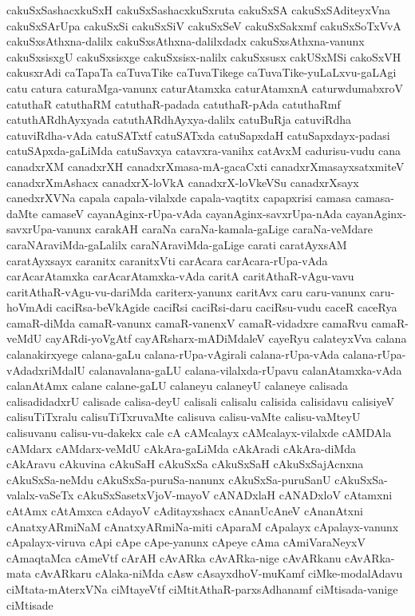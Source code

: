 {cakuSxSashacxkuSxH
cakuSxSashacxkuSxruta
cakuSxSA
cakuSxSAditeyxVna
cakuSxSArUpa
cakuSxSi
cakuSxSiV
cakuSxSeV
cakuSxSakxmf
cakuSxSoTxVvA
cakuSxsAthxna-dalilx
cakuSxsAthxna-dalilxdadx
cakuSxsAthxna-vanunx
cakuSxsisxgU
cakuSxsisxge
cakuSxsisx-nalilx
cakuSxsusx
cakUSxMSi
cakoSxVH
cakusxrAdi
caTapaTa
caTuvaTike
caTuvaTikege
caTuvaTike-yuLaLxvu-gaLAgi
catu
catura
caturaMga-vanunx
caturAtamxka
caturAtamxnA
caturwdumabxroV
catuthaR
catuthaRM
catuthaR-padada
catuthaR-pAda
catuthaRmf
catuthARdhAyxyada
catuthARdhAyxya-dalilx
catuBuRja
catuviRdha
catuviRdha-vAda
catuSATxtf
catuSATxda
catuSapxdaH
catuSapxdayx-padasi
catuSApxda-gaLiMda
catuSavxya
catavxra-vanihx
catAvxM
cadurisu-vudu
cana
canadxrXM
canadxrXH
canadxrXmasa-mA-gacaCxti
canadxrXmasayxsatxmiteV
canadxrXmAshacx
canadxrX-loVkA
canadxrX-loVkeVSu
canadxrXsayx
canedxrXVNa
capala
capala-vilalxde
capala-vaqtitx
capapxrisi
camasa
camasa-daMte
camaseV
cayanAginx-rUpa-vAda
cayanAginx-savxrUpa-nAda
cayanAginx-savxrUpa-vanunx
carakAH
caraNa
caraNa-kamala-gaLige
caraNa-veMdare
caraNAraviMda-gaLalilx
caraNAraviMda-gaLige
carati
caratAyxsAM
caratAyxsayx
caranitx
caranitxVti
carAcara
carAcara-rUpa-vAda
carAcarAtamxka
carAcarAtamxka-vAda
caritA
caritAthaR-vAgu-vavu
caritAthaR-vAgu-vu-dariMda
cariterx-yanunx
caritAvx
caru
caru-vanunx
caru-hoVmAdi
caciRsa-beVkAgide
caciRsi
caciRsi-daru
caciRsu-vudu
caceR
caceRya
camaR-diMda
camaR-vanunx
camaR-vanenxV
camaR-vidadxre
camaRvu
camaR-veMdU
cayARdi-yoVgAtf
cayARsharx-mADiMdaleV
cayeRyu
calateyxVva
calana
calanakirxyege
calana-gaLu
calana-rUpa-vAgirali
calana-rUpa-vAda
calana-rUpa-vAdadxriMdalU
calanavalana-gaLU
calana-vilalxda-rUpavu
calanAtamxka-vAda
calanAtAmx
calane
calane-gaLU
calaneyu
calaneyU
calaneye
calisada
calisadidadxrU
calisade
calisa-deyU
calisali
calisalu
calisida
calisidavu
calisiyeV
calisuTiTxralu
calisuTiTxruvaMte
calisuva
calisu-vaMte
calisu-vaMteyU
calisuvanu
calisu-vu-dakekx
cale
cA
cAMcalayx
cAMcalayx-vilalxde
cAMDAla
cAMdarx
cAMdarx-veMdU
cAkAra-gaLiMda
cAkAradi
cAkAra-diMda
cAkAravu
cAkuvina
cAkuSaH
cAkuSxSa
cAkuSxSaH
cAkuSxSajAcnxna
cAkuSxSa-neMdu
cAkuSxSa-puruSa-nanunx
cAkuSxSa-puruSanU
cAkuSxSa-valalx-vaSeTx
cAkuSxSasetxVjoV-mayoV
cANADxlaH
cANADxloV
cAtamxni
cAtAmx
cAtAmxca
cAdayoV
cAditayxshacx
cAnanUcAneV
cAnanAtxni
cAnatxyARmiNaM
cAnatxyARmiNa-miti
cAparaM
cApalayx
cApalayx-vanunx
cApalayx-viruva
cApi
cApe
cApe-yanunx
cApeye
cAma
cAmiVaraNeyxV
cAmaqtaMca
cAmeVtf
cArAH
cAvARka
cAvARka-nige
cAvARkanu
cAvARka-mata
cAvARkaru
cAlaka-niMda
cAsw
cAsayxdhoV-muKamf
ciMke-modalAdavu
ciMtata-mAterxVNa
ciMtayeVtf
ciMtitAthaR-parxsAdhanamf
ciMtisada-vanige
ciMtisade
}
